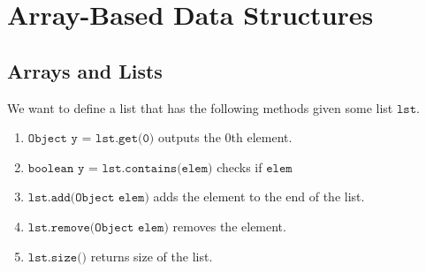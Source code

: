 \section{Array-Based Data Structures} 

\subsection{Arrays and Lists} 

  We want to define a list that has the following methods given some list $\texttt{lst}$. 
  \begin{enumerate}
    \item $\texttt{Object y = lst.get(0)}$ outputs the $0$th element. 
    \item $\texttt{boolean y = lst.contains(elem)}$ checks if $\texttt{elem}$ 
    \item $\texttt{lst.add(Object elem)}$ adds the element to the end of the list. 
    \item $\texttt{lst.remove(Object elem)}$ removes the element. 
    \item $\texttt{lst.size()}$ returns size of the list. 
  \end{enumerate}

